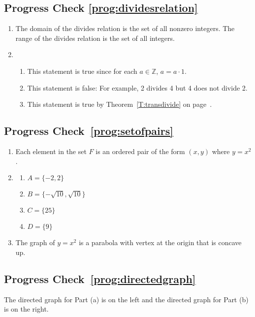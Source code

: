 \subsection*{Progress Check \ref{prog:dividesrelation}}
\begin{enumerate}
\item The domain of the divides relation is the set of all nonzero integers.  The range of the divides relation is the set of all integers.

\item \begin{enumerate}
\item This statement is true since for each  
$a \in \mathbb{Z}$,  $a = a \cdot 1$.

\item This statement is false: For example,  2  divides  4  but  4  does not divide  2.

\item This statement is true by Theorem~\ref{T:transdivide} on page~\pageref{T:transdivide}.
\end{enumerate}
\end{enumerate}



\subsection*{Progress Check~\ref{prog:setofpairs}}
\begin{enumerate}
  \item Each element in the set $F$ is an ordered pair of the form $(x, y)$ where $y = x^2$.
  \item \begin{multicols}{2} \begin{enumerate} 
     \item $A = \{ -2, 2 \}$
     \item $B = \{ -\sqrt{10}, \sqrt{10} \}$
     \item $C = \{25 \}$
     \item $D = \{ 9 \}$
  \end{enumerate} \end{multicols}
  \item The graph of $y = x^2$ is a parabola with vertex at the origin that is concave up.
\end{enumerate}



\subsection*{Progress Check~\ref{prog:directedgraph}}
The directed graph for Part (a) is on the left and the directed graph for Part (b) is on the right.

